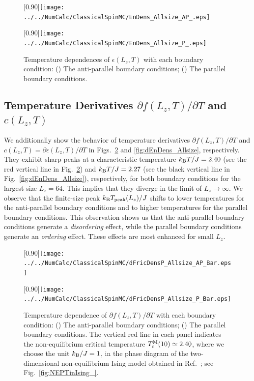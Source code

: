\begin{figure}[htbp]
	\centering
	\subcaptionbox{\label{fig:EnDens_Allsize_AP}}[0.90\linewidth]{\texttt{[image: ../../NumCalc/ClassicalSpinMC/EnDens\_Allsize\_AP\_.eps]}}
	
	\subcaptionbox{\label{fig:EnDens_Allsize_P}}[0.90\linewidth]{\texttt{[image: ../../NumCalc/ClassicalSpinMC/EnDens\_Allsize\_P\_.eps]}}
	
	\caption{Temperature dependences of $\epsilon(L_{z}, T)$ with each boundary condition: () The anti-parallel boundary conditions; () The parallel boundary conditions.}
	\label{fig:EnDens_Allsize}
\end{figure}


\subsection{Temperature Derivatives $\partial f(L_{z}, T)/\partial T$ and $c(L_{z}, T)$}

We additionally show the behavior of temperature derivatives $\partial f(L_{z}, T)/\partial T$ and $c(L_{z},T)=\partial \epsilon(L_{z}, T)/\partial T$ in Figs.~\ref{fig:dFricDens_Allsize} and \ref{fig:dEnDens_Allsize}, respectively. They exhibit sharp peaks at a characteristic temperature $k_{\rm B}T/J=2.40$ (see the red vertical line in Fig.~\ref{fig:dFricDens_Allsize}) and $k_{\rm B}T/J=2.27$ (see the black vertical line in Fig.~\ref{fig:dEnDens_Allsize}), respectively, for both boundary conditions for the largest size $L_{z}=64$. This implies that they diverge in the limit of $L_{z}\to\infty$. We observe that the finite-size peak $k_{\rm B}T_{\rm peak}(L_{z})/J$ shifts to lower temperatures for the anti-parallel boundary conditions and to higher temperatures for the parallel boundary conditions. This observation shows us that the anti-parallel boundary conditions generate a \textit{disordering} effect, while the parallel boundary conditions generate an \textit{ordering} effect. These effects are most enhanced for small $L_{z}$.

\begin{figure}[htbp]
	\centering
	\subcaptionbox{\label{fig:dFricDens_Allsize_AP}}[0.90\linewidth]{\texttt{[image: ../../NumCalc/ClassicalSpinMC/dFricDensP\_Allsize\_AP\_Bar.eps]}}
	
	\subcaptionbox{\label{fig:dFricDens_Allsize_P}}[0.90\linewidth]{\texttt{[image: ../../NumCalc/ClassicalSpinMC/dFricDensP\_Allsize\_P\_Bar.eps]}}
	
	\caption{Temperature dependence of $\partial f(L_{z}, T)/\partial T$ with each boundary condition: () The anti-parallel boundary conditions; () The parallel boundary conditions. The vertical red line in each panel indicates the non-equilibrium critical temperature $T^{\rm M}_{\rm c}(10)\simeq 2.40$, where we choose the unit $k_{\rm B}/J=1$, in the phase diagram of the two-dimensional non-equilibrium Ising model obtained in Ref.~\cite{Hucht2009b}; see Fig.~\ref{fig:NEPTinIsing_}.}
	\label{fig:dFricDens_Allsize}
\end{figure}

